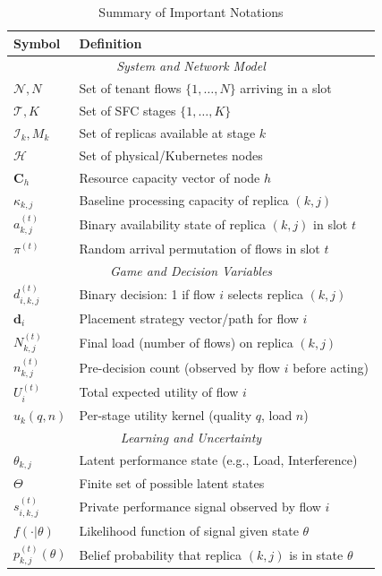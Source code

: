 \documentclass[journal]{IEEEtran}
\theoremstyle{plain}
\theoremstyle{definition}
\theoremstyle{remark}
\begin{document}
\begin{table}[!t]
\centering
\caption{Summary of Important Notations}
\label{tab:notations}
\renewcommand{\arraystretch}{1.2}
\begin{tabular}{l p{6cm}}
\toprule
\textbf{Symbol} & \textbf{Definition} \\
\midrule
\multicolumn{2}{c}{\textit{System and Network Model}} \\
\midrule
$\mathcal{N}, N$ & Set of tenant flows $\{1,\dots,N\}$ arriving in a slot \\
$\mathcal{T}, K$ & Set of SFC stages $\{1,\dots,K\}$ \\
$\mathcal{I}_k, M_k$ & Set of replicas available at stage $k$ \\
$\mathcal{H}$ & Set of physical/Kubernetes nodes \\
$\mathbf{C}_h$ & Resource capacity vector of node $h$ \\
$\kappa_{k,j}$ & Baseline processing capacity of replica $(k,j)$ \\
$a_{k,j}^{(t)}$ & Binary availability state of replica $(k,j)$ in slot $t$ \\
$\pi^{(t)}$ & Random arrival permutation of flows in slot $t$ \\
\midrule
\multicolumn{2}{c}{\textit{Game and Decision Variables}} \\
\midrule
$d_{i,k,j}^{(t)}$ & Binary decision: 1 if flow $i$ selects replica $(k,j)$ \\
$\mathbf{d}_i$ & Placement strategy vector/path for flow $i$ \\
$N_{k,j}^{(t)}$ & Final load (number of flows) on replica $(k,j)$ \\
$n_{k,j}^{(t)}$ & Pre-decision count (observed by flow $i$ before acting) \\
$U_i^{(t)}$ & Total expected utility of flow $i$ \\
$u_k(q,n)$ & Per-stage utility kernel (quality $q$, load $n$) \\
\midrule
\multicolumn{2}{c}{\textit{Learning and Uncertainty}} \\
\midrule
$\theta_{k,j}$ & Latent performance state (e.g., Load, Interference) \\
$\Theta$ & Finite set of possible latent states \\
$s_{i,k,j}^{(t)}$ & Private performance signal observed by flow $i$ \\
$f(\cdot|\theta)$ & Likelihood function of signal given state $\theta$ \\
$p_{k,j}^{(t)}(\theta)$ & Belief probability that replica $(k,j)$ is in state $\theta$ \\

\end{tabular}
\end{table}
\end{document}
